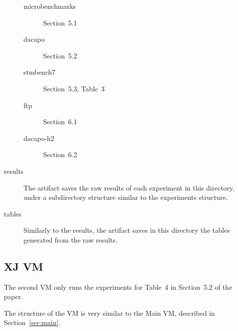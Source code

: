 \documentclass[12pt]{article}
\begin{document}
\begin{description}
        \begin{description}

            \item[microbenchmarks] Section~5.1

            \item[dacapo] Section~5.2

            \item[stmbench7] Section~5.3, Table~3

            \item[ftp] Section~6.1

            \item[dacapo-h2] Section~6.2

        \end{description}

    \item[results]  The artifact saves the raw results of each experiment in
        this directory, under a subdirectory structure similar to the
        experiments structure.

    \item[tables]  Similarly to the results, the artifact saves in this
        directory the tables generated from the raw results.

\end{description}

\subsection{XJ VM}
\label{sec:xj}

The second VM only runs the experiments for Table~4 in Section~5.2 of the paper.

The structure of the VM is very similar to the Main VM, described in
Section~\ref{sec:main}.
\end{document}
